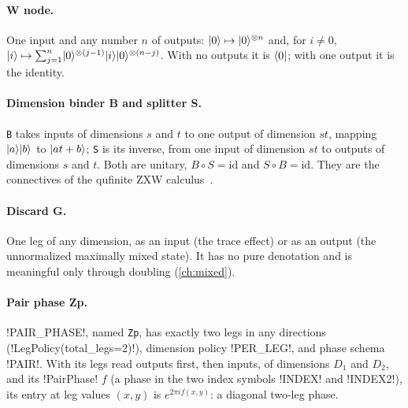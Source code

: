 \paragraph{W node.} One input and any number $n$ of outputs: $\lvert 0 \rangle\mapsto\lvert 0 \rangle^{\otimes n}$ and, for $i\neq 0$, $\lvert i \rangle\mapsto\sum_{j=1}^{n}\lvert 0 \rangle^{\otimes (j-1)}\lvert i \rangle\lvert 0 \rangle^{\otimes(n-j)}$. With no outputs it is $\langle 0 \rvert$; with one output it is the identity.

\paragraph{Dimension binder B and splitter S.} \texttt{B} takes inputs of dimensions $s$ and $t$ to one output of dimension $st$, mapping $\lvert a \rangle\lvert b \rangle$ to $\lvert at+b \rangle$; \texttt{S} is its inverse, from one input of dimension $st$ to outputs of dimensions $s$ and $t$. Both are unitary, $B\circ S=\mathrm{id}$ and $S\circ B=\mathrm{id}$. They are the connectives of the qufinite ZXW calculus~\cite{wang2023qufinitezxw}.

\paragraph{Discard G.} One leg of any dimension, as an input (the trace effect) or as an output (the unnormalized maximally mixed state). It has no pure denotation and is meaningful only through doubling (\cref{ch:mixed}).

\paragraph{Pair phase Zp.} \py!PAIR_PHASE!, named \texttt{Zp}, has exactly two legs in any directions (\py!LegPolicy(total_legs=2)!), dimension policy \code!PER_LEG!, and phase schema \code!PAIR!. With its legs read outputs first, then inputs, of dimensions $D_1$ and $D_2$, and its \py!PairPhase! $f$ (a phase in the two index symbols \py!INDEX! and \py!INDEX2!), its entry at leg values $(x,y)$ is $e^{2\pi i f(x,y)}$: a diagonal two-leg phase.


